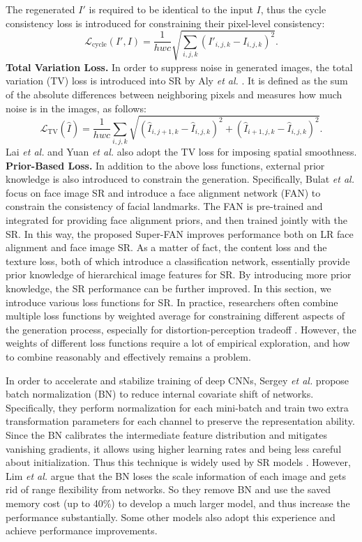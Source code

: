 {The regenerated $I'$ is required to be identical to the input $I$, thus the cycle consistency loss is introduced for constraining their pixel-level consistency:
\begin{equation}
    \mathcal{L}_{\text{cycle}} (I', I) = \frac{1}{hwc} \sqrt{\sum_{i,j,k} (I'_{i,j,k} - I_{i,j,k})^2} .
\end{equation}
\textbf{Total Variation Loss.}
In order to suppress noise in generated images, the total variation (TV) loss  is introduced into SR by Aly \textit{et al.} .
It is defined as the sum of the absolute differences between neighboring pixels and measures how much noise is in the images, as follows:
\begin{equation}
    \mathcal{L}_{\text{TV}} (\hat{I}) = \frac{1}{hwc} \sum_{i,j,k} \sqrt{
        (\hat{I}_{i,j+1,k} - \hat{I}_{i,j,k})^2 +
        (\hat{I}_{i+1,j,k} - \hat{I}_{i,j,k})^2} .
\end{equation}
Lai \textit{et al.}  and Yuan \textit{et al.}  also adopt the TV loss for imposing spatial smoothness.
\textbf{Prior-Based Loss.}
In addition to the above loss functions, external prior knowledge is also introduced to constrain the generation.
Specifically, Bulat \textit{et al.}  focus on face image SR and introduce a face alignment network (FAN) to constrain the consistency of facial landmarks.  
The FAN is pre-trained and integrated for providing face alignment priors, and then trained jointly with the SR.
In this way, the proposed Super-FAN improves performance both on LR face alignment and face image SR.
As a matter of fact, the content loss and the texture loss, both of which introduce a classification network, essentially provide prior knowledge of hierarchical image features for SR.
By introducing more prior knowledge, the SR performance can be further improved.
In this section, we introduce various loss functions for SR.
In practice, researchers often combine multiple loss functions by weighted average  for constraining different aspects of the generation process, especially for distortion-perception tradeoff .
However, the weights of different loss functions require a lot of empirical exploration, and how to combine reasonably and effectively remains a problem.

In order to accelerate and stabilize training of deep CNNs, Sergey \textit{et al.}  propose batch normalization (BN) to reduce internal covariate shift of networks.
Specifically, they perform normalization for each mini-batch and train two extra transformation parameters for each channel to preserve the representation ability.
Since the BN calibrates the intermediate feature distribution and mitigates vanishing gradients, it allows using higher learning rates and being less careful about initialization.
Thus this technique is widely used by SR models .
However, Lim \textit{et al.}  argue that the BN loses the scale information of each image and gets rid of range flexibility from networks.
So they remove BN and use the saved memory cost (up to 40\%) to develop a much larger model, and thus increase the performance substantially.
Some other models  also adopt this experience and achieve performance improvements.

}
